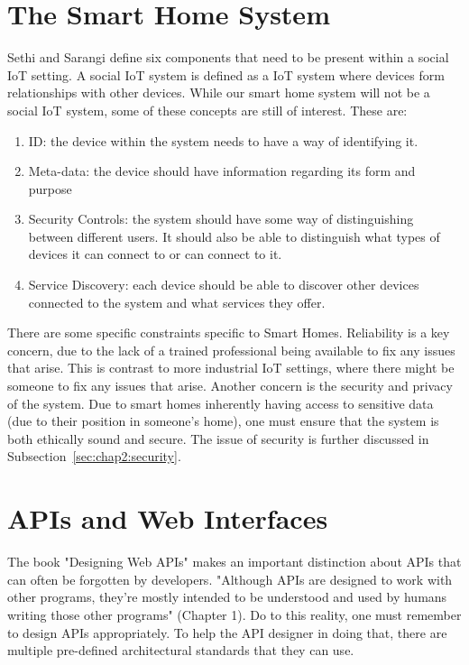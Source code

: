\section{The Smart Home System} \label{sec:chap2:smarthome}
Sethi and Sarangi \cite{IoTArchitectures} define six components that need to be present within a social IoT setting. A social IoT system is defined as a IoT system where devices form relationships with other devices. While our smart home system will not be a social IoT system, some of these concepts are still of interest. These are: 
\begin{enumerate}
    \item ID: the device within the system needs to have a way of identifying 
        it.
    \item Meta-data: the device should have information regarding its form and 
        purpose
    \item Security Controls: the system should have some way of distinguishing 
        between different users. It should also be able to distinguish what 
        types of devices it can connect to or can connect to it.
    \item Service Discovery: each device should be able to discover other 
        devices connected to the system and what services they offer.
\end{enumerate}

There are some specific constraints specific to Smart Homes. Reliability is a key concern, due to the lack of a trained professional being available to fix any issues that arise. This is contrast to more industrial IoT settings, where there might be someone to fix any issues that arise. Another concern is the security and privacy of the system. Due to smart homes inherently having access to sensitive data (due to their position in someone's home), one must ensure that the system is both ethically sound and secure. The issue of security is further discussed in Subsection~\ref{sec:chap2:security}.

\section{APIs and Web Interfaces} \label{sec:chap2:API}
The book "Designing Web APIs" makes an important distinction about APIs that can often be forgotten by developers. "Although APIs are designed to work with other programs, they’re mostly intended to be understood and used by humans writing those other programs" \cite{DesigningWebApis} (Chapter 1). Do to this reality, one must remember to design APIs appropriately. To help the API designer in doing that, there are multiple pre-defined architectural standards that they can use. 

